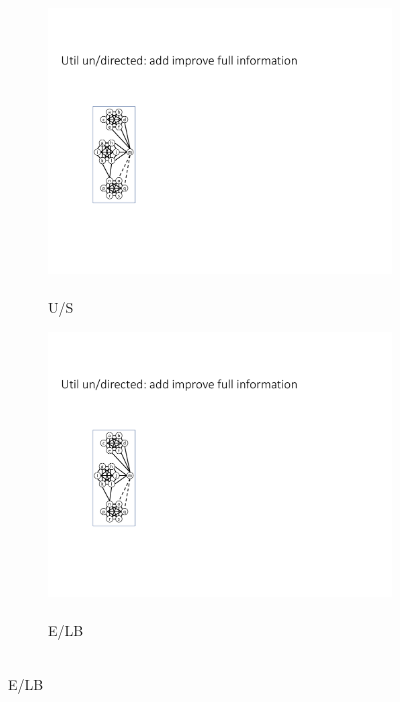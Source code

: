 \documentclass{article}
\begin{document}
\begin{figure}[t]
    \centering  
        \begin{subfigure}{0.09\textwidth}
            \centering
            \includegraphics[page=3,width=\textwidth]{Graphs/graphs.pdf}
            \caption{\\U/S}
            \label{fig:Util_add}
        \end{subfigure}
        \hfill
        \begin{subfigure}{0.09\textwidth}
            \centering
            \includegraphics[page=12,width=\textwidth]{Graphs/graphs.pdf}
            \caption{\\E/LB}
            \label{fig:Egal_undirected_add_LB}

\end{subfigure}
\end{figure}
\end{document}
